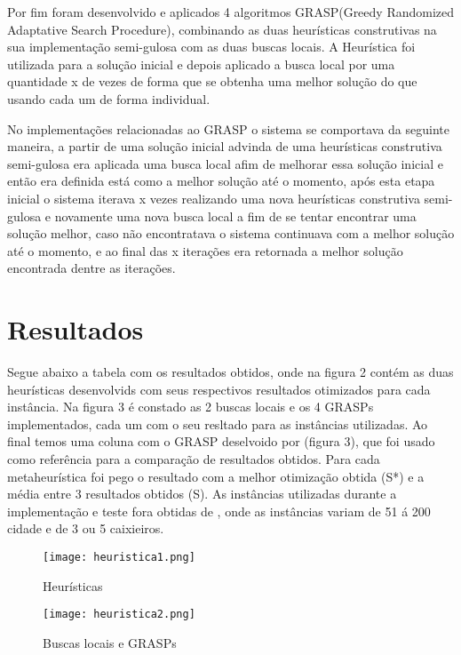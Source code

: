 \documentclass[12pt]{article}
\begin{document}
Por fim foram desenvolvido e aplicados 4 algoritmos GRASP(Greedy Randomized Adaptative Search Procedure), combinando as duas heurísticas construtivas na sua implementação semi-gulosa com as duas buscas locais. A Heurística foi utilizada para a solução inicial e depois aplicado a busca local por uma quantidade x de vezes de forma que se obtenha uma melhor solução do que usando cada um de forma individual.

No implementações relacionadas ao GRASP o sistema se comportava da seguinte maneira, a partir de uma solução inicial advinda de uma heurísticas construtiva semi-gulosa era aplicada uma busca local afim de melhorar essa solução inicial e então era definida está como a melhor solução até o momento, após esta etapa inicial o sistema iterava x vezes realizando uma nova heurísticas construtiva semi-gulosa e novamente uma nova busca local a fim de se tentar encontrar uma solução melhor, caso não encontratava o sistema continuava com a melhor solução até o momento, e ao final das x iterações era retornada a melhor solução encontrada dentre as iterações.

\section{Resultados}

Segue abaixo a tabela com os resultados obtidos, onde na figura 2 contém as duas heurísticas desenvolvids com seus respectivos resultados otimizados para cada instância. Na figura 3 é constado as 2 buscas locais e os 4 GRASPs implementados, cada um com o seu resltado para as instâncias utilizadas. Ao final temos uma coluna com o GRASP deselvoido por \cite{alvesa:84} (figura 3), que foi usado como referência para a comparação de resultados obtidos. Para cada metaheurística foi pego o resultado com a melhor otimização obtida (S*) e a média entre 3 resultados obtidos (S). As instâncias utilizadas durante a implementação e teste fora obtidas de \cite{hehao:22}, onde as instâncias variam de 51 á 200 cidade e de 3 ou 5 caixieiros.

\begin{figure}[ht]
\centering
\texttt{[image: heuristica1.png]}
\caption{Heurísticas}
\label{fig:heuristica}
\end{figure}

\begin{figure}[ht]
\centering
\texttt{[image: heuristica2.png]}
\caption{Buscas locais e GRASPs}
\label{fig:heuristica}
\end{figure}
\end{document}

